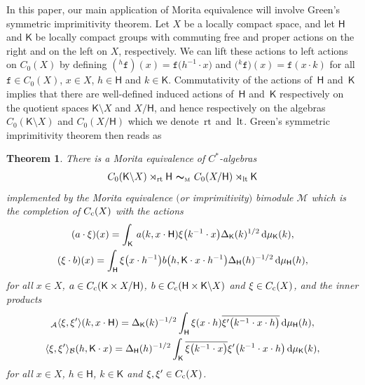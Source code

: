 \documentclass[10pt,a4paper]{amsart}
\numberwithin{equation}{section}
\newcommand{\mbf}[1]{{\boldsymbol {#1} }}
\def\dd{{\rm d}}
\newcommand{\sfH}{\mathsf{H}}
\newcommand{\sfK}{\mathsf{K}}
\newcommand{\lt}{{\rm lt}}
\newcommand{\rt}{{\rm rt}}
\def\alg{{\mathcal A}}
\def\balg{{\mathcal B}}
\def\Mcal{{\mathcal M}}
\newtheorem{Theorem}{Theorem}[section]
\begin{document}
In this paper, our main application of Morita equivalence will involve
Green's symmetric imprimitivity theorem. Let $X$ be a locally compact space, and let
$\sfH $ and $\sfK $ be locally compact groups with commuting free and
proper actions on the right and on the left on $X$, respectively. We can lift these
actions to left actions on $C_0(X)$ by defining
$({}^h\mathtt{f})(x)=\mathtt{f}\big(h^{-1}\cdot x\big)$ and $\big({}^k\mathtt{f}\big)(x)=\mathtt{f}(x\cdot k)$
for all $\mathtt{f}\in C_0(X)$, $x\in X$, $h\in \sfH$ and $k\in \sfK $. Commutativity
of the actions of~$\sfH $ and~$\sfK $ implies that there are well-defined
induced actions of~$\sfH $ and~$\sfK $
respectively on the quotient spaces $\sfK {\setminus} X$ and $X/\sfH $, and hence
respectively on the algebras $C_0(\sfK {\setminus} X)$ and
$C_0(X/\sfH )$ which we denote~$\rt$ and~$\lt$. Green's symmetric imprimitivity theorem then reads as~\cite[Corollary~4.10]{Williams2007}
\begin{Theorem} \label{thm:Green}
There is a Morita
equivalence of $C^*$-algebras
\begin{gather}\label{eq:Greenimprim}
C_0(\sfK {\setminus} X)\rtimes_\rt \sfH \ \mbf\sim_{\text{\rm \tiny M}} \ C_0(X/\sfH )\rtimes_\lt \sfK
\end{gather}
implemented by the Morita equivalence $($or imprimitivity$)$
bimodule $\Mcal$ which is the completion of $C_{\rm c}(X)$ with the
actions
\begin{gather*}
(a\cdot\xi)(x) =\int_\sfK\,a(k,x\cdot\sfH) \xi\big(k^{-1}\cdot x\big)
\Delta_\sfK(k)^{1/2} \, \dd\mu_\sfK(k) , \\
(\xi\cdot b)(x) =\int_\sfH \xi\big(x\cdot h^{-1}\big) b\big(h,\sfK\cdot x\cdot h^{-1}\big) \Delta_\sfH(h)^{-1/2} \, \dd\mu_\sfH(h) ,
\end{gather*}
for all $x\in X$, $a\in C_{\rm c}(\sfK\times X/\sfH)$, $b\in C_{\rm
 c}(\sfH\times \sfK {\setminus} X)$ and $\xi\in C_{\rm
 c}(X)$, and the inner products
\begin{gather*}
{}_\alg\langle\xi,\xi'\rangle(k,x\cdot\sfH) = \Delta_\sfK(k)^{-1/2}
\int_\sfH \xi(x\cdot h) \overline{\xi'\big(k^{-1}\cdot x\cdot h\big)} \,
\dd\mu_\sfH(h) , \nonumber\\
\langle\xi,\xi'\rangle_\balg(h,\sfK\cdot x) =
\Delta_\sfH(h)^{-1/2} \int_\sfK \overline{\xi\big(k^{-1}\cdot x\big)}
\xi'\big(k^{-1}\cdot x\cdot h\big) \, \dd\mu_\sfK(k)  ,
\end{gather*}
for all $x\in X$, $h\in\sfH$, $k\in\sfK$ and $\xi,\xi'\in C_{\rm c}(X)$.
\end{Theorem}
\end{document}
